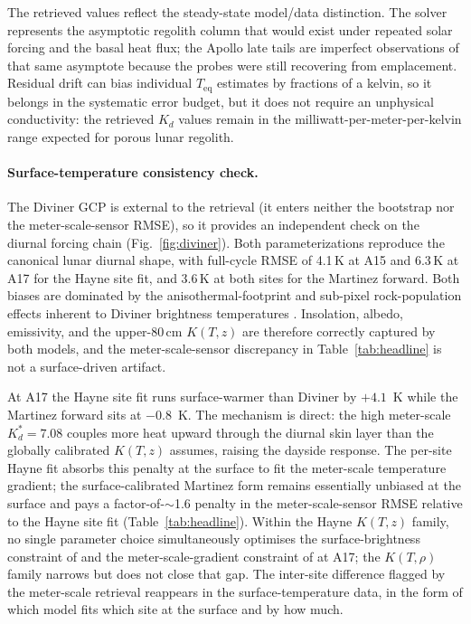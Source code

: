 \documentclass[11pt]{article}
\newcommand{\zborestem}{80\,\si{\centi\meter}}
\begin{document}
The retrieved values reflect the steady-state model/data distinction. The
solver represents the asymptotic regolith column that would exist under
repeated solar forcing and the basal heat flux; the Apollo late tails are
imperfect observations of that same asymptote because the probes were still
recovering from emplacement. Residual drift can bias individual
$T_\mathrm{eq}$ estimates by fractions of a kelvin, so it belongs in the
systematic error budget, but it does not require an unphysical conductivity:
the retrieved $K_d$ values remain in the milliwatt-per-meter-per-kelvin
range expected for porous lunar regolith.

\paragraph*{Surface-temperature consistency check.}
The Diviner GCP is external to the retrieval (it enters neither the
bootstrap nor the meter-scale-sensor RMSE), so it
provides an independent check on the diurnal forcing chain
(Fig.~\ref{fig:diviner}). Both parameterizations reproduce the canonical
lunar diurnal shape, with full-cycle RMSE of 4.1\,K at A15 and 6.3\,K at A17 for the Hayne
site fit, and 3.6\,K at both sites for the Martinez forward. Both
biases are dominated by the anisothermal-footprint and
sub-pixel rock-population effects inherent to Diviner brightness
temperatures \citep{bandfield2015,hayne2017}. Insolation, albedo,
emissivity, and the upper-$\zborestem$ $K(T,z)$ are therefore correctly
captured by both models, and the
meter-scale-sensor discrepancy in
Table~\ref{tab:headline} is not a surface-driven artifact.

At A17 the Hayne site fit runs surface-warmer than Diviner by
$+4.1$~K
while the Martinez forward sits at $-0.8$~K. The mechanism is direct: the
high meter-scale $K_d^{*}=7.08$ couples
more heat upward
through the diurnal skin layer than the globally calibrated $K(T,z)$
assumes, raising the dayside response. The per-site Hayne fit absorbs this
penalty at the surface to fit the
meter-scale temperature gradient; the surface-calibrated
Martinez form remains essentially unbiased at the surface and pays a
factor-of-$\sim$1.6 penalty in the meter-scale-sensor RMSE relative to
the Hayne site fit (Table~\ref{tab:headline}). Within the Hayne $K(T,z)$ family,
no single parameter choice simultaneously optimises the
surface-brightness constraint of \citet{williams2017diviner} and the
meter-scale-gradient constraint of \citet{nagihara2018} at A17; the
$K(T,\rho)$ family narrows but does not close that gap. The inter-site
difference flagged by the
meter-scale retrieval reappears in the surface-temperature
data, in the form of which model fits which site at the surface and by how
much.
\end{document}
